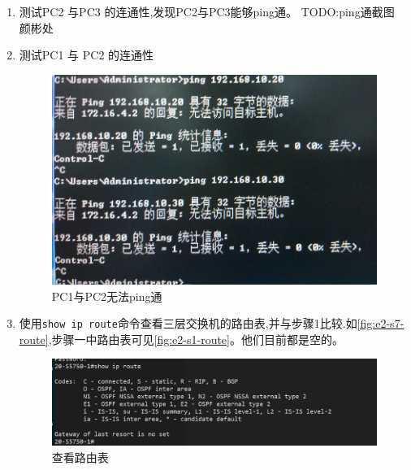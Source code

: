 \documentclass{myreport}
\begin{document}
\begin{enumerate}
    \item 测试PC2 与PC3 的连通性,发现PC2与PC3能够ping通。
    TODO:ping通截图 颜彬处

    \item 测试PC1 与 PC2 的连通性
    
        \begin{figure}[htp]
            \centering
            \includegraphics[width=13cm]{"./figure/2018-05-17-22-58-38.png"}
            \caption{PC1与PC2无法ping通}
            \label{fig:e2-s7-pc1-ping-pc3}
        \end{figure}
        
    \item 使用\texttt{show ip route}命令查看三层交换机的路由表,并与步骤1比较.如\autoref{fig:e2-s7-route},步骤一中路由表可见\autoref{fig:e2-s1-route}。他们目前都是空的。
    \begin{figure}[htp]
        \centering
        \includegraphics[width=13cm]{"./figure/2018-05-17-17-16-01.png"}
        \caption{查看路由表}
        \label{fig:e2-s7-route}
    \end{figure}
    
    
\end{enumerate}
\end{document}
